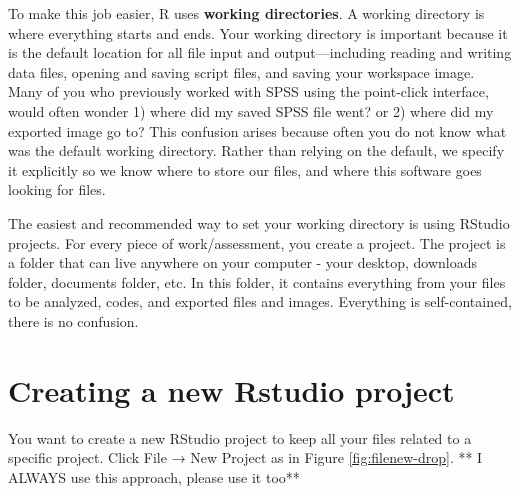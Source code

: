 \documentclass[
]{book}
\begin{document}
To make this job easier, R uses \textbf{working directories}. A working directory is where everything starts and ends. Your working directory is important because it is the default location for all file input and output---including reading and writing data files, opening and saving script files, and saving your workspace image. Many of you who previously worked with SPSS using the point-click interface, would often wonder 1) where did my saved SPSS file went? or 2) where did my exported image go to? This confusion arises because often you do not know what was the default working directory. Rather than relying on the default, we specify it explicitly so we know where to store our files, and where this software goes looking for files.

The easiest and recommended way to set your working directory is using RStudio projects. For every piece of work/assessment, you create a project. The project is a folder that can live anywhere on your computer - your desktop, downloads folder, documents folder, etc. In this folder, it contains everything from your files to be analyzed, codes, and exported files and images. Everything is self-contained, there is no confusion.

\hypertarget{NAVIGATE-PROJECTS}{%
\section{Creating a new Rstudio project}\label{NAVIGATE-PROJECTS}}

You want to create a new RStudio project to keep all your files related to a specific project.
Click File → New Project as in Figure \ref{fig:filenew-drop}. ** I ALWAYS use this approach, please use it too**
\end{document}
